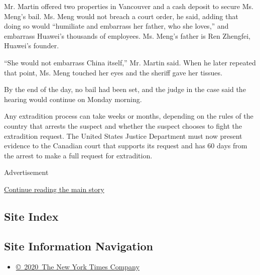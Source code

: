 Mr. Martin offered two properties in Vancouver and a cash deposit to
secure Ms. Meng's bail. Ms. Meng would not breach a court order, he
said, adding that doing so would ``humiliate and embarrass her father,
who she loves,'' and embarrass Huawei's thousands of employees. Ms.
Meng's father is Ren Zhengfei, Huawei's founder.

``She would not embarrass China itself,'' Mr. Martin said. When he later
repeated that point, Ms. Meng touched her eyes and the sheriff gave her
tissues.

By the end of the day, no bail had been set, and the judge in the case
said the hearing would continue on Monday morning.

Any extradition process can take weeks or months, depending on the rules
of the country that arrests the suspect and whether the suspect chooses
to fight the extradition request. The United States Justice Department
must now present evidence to the Canadian court that supports its
request and has 60 days from the arrest to make a full request for
extradition.

Advertisement

\protect\hyperlink{after-bottom}{Continue reading the main story}

\hypertarget{site-index}{%
\subsection{Site Index}\label{site-index}}

\hypertarget{site-information-navigation}{%
\subsection{Site Information
Navigation}\label{site-information-navigation}}

\begin{itemize}
\tightlist
\item
  \href{https://help.nytimes.com/hc/en-us/articles/115014792127-Copyright-notice}{©~2020~The
  New York Times Company}
\end{itemize}

